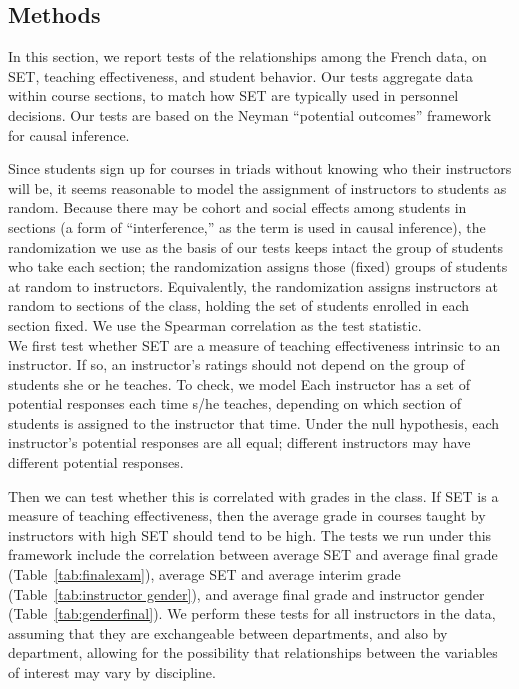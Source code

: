 \documentclass[12pt]{article}
\begin{document}
\subsection{Methods}\label{boring:methods}
In this section, we report tests of the relationships among the French data,
on SET, teaching effectiveness, and student behavior.
Our tests aggregate data within course sections, to match how SET are typically
used in personnel decisions. 
Our tests are based on the Neyman ``potential outcomes'' framework for causal inference.
 
Since students sign up for courses in triads without knowing who their instructors will be, 
it seems reasonable to model the assignment of instructors to students as random.
Because there may be cohort and social effects among students in sections (a form of
``interference,'' as the term is used in causal inference), the randomization we
use as the basis of our tests keeps intact the group of students who take each section;
the randomization assigns those (fixed) groups of students at random to instructors.
Equivalently, the randomization assigns instructors at random to sections of the class,
holding the set of students enrolled in each section fixed.
We use the Spearman correlation as the test statistic.  \\

We first test whether SET are a measure of teaching effectiveness intrinsic to an instructor.  
If so, an instructor's ratings should not depend on the group of students she or he teaches.
To check, we model 
Each instructor has a set of potential responses each time s/he teaches, depending on which 
section of students is assigned to the instructor that time.
Under the null hypothesis, each instructor's potential responses are all equal;
different instructors may have different potential responses.

Then we can test whether this is correlated with grades in the class.  
If SET is a measure of teaching effectiveness, then the average grade in courses taught by 
instructors with high SET should tend to be high.  
The tests we run under this framework include the correlation between average SET and average final grade (Table~\ref{tab:finalexam}), average SET and average interim grade 
(Table~\ref{tab:instructor gender}), and average final grade and instructor gender (Table~\ref{tab:genderfinal}).  We perform these tests for all instructors in the data, assuming that they are exchangeable between departments, and also by department, allowing for the possibility that relationships between the variables of interest may vary by discipline. \\
\end{document}
